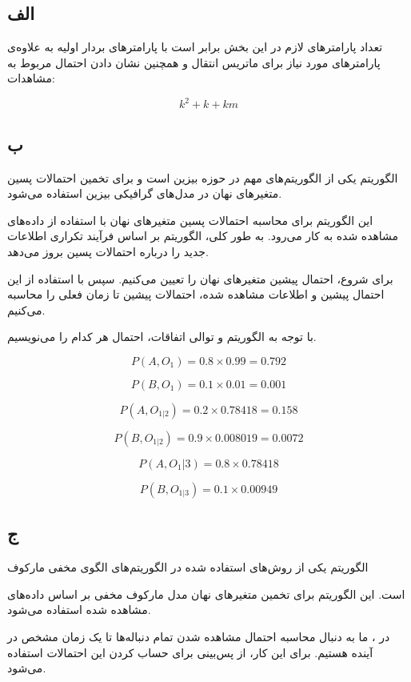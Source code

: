 \subsection*{الف}

تعداد پارامترهای لازم در این بخش برابر است با پارامترهای بردار اولیه به علاوه‌ی پارامترهای مورد نیاز برای ماتریس انتقال و همچنین نشان دادن احتمال مربوط به مشاهدات:

$$
k^2 + k + km	
$$

\subsection*{ب}

الگوریتم
یکی از الگوریتم‌های مهم در حوزه بیزین
است و برای تخمین احتمالات پسین
متغیرهای نهان در مدل‌های گرافیکی بیزین استفاده می‌شود.

این الگوریتم برای محاسبه احتمالات پسین متغیرهای نهان با استفاده از داده‌های مشاهده شده به کار می‌رود. به طور کلی، الگوریتم
بر اساس فرآیند تکراری اطلاعات جدید را درباره احتمالات پسین بروز می‌دهد.

برای شروع، احتمال پیشین
متغیرهای نهان را تعیین می‌کنیم. سپس با استفاده از این احتمال پیشین و اطلاعات مشاهده شده، احتمالات پیشین تا زمان فعلی را محاسبه می‌کنیم.

با توجه به الگوریتم
و توالی اتفاقات، احتمال هر کدام را می‌نویسیم.

$$
P(A, O_1) = 0.8 \times 0.99 = 0.792
$$

$$
P(B, O_1) = 0.1 \times 0.01 = 0.001
$$

$$
P(A, O_{1 | 2}) = 0.2 \times 0.78418 = 0.158
$$

$$
P(B, O_{1 | 2}) = 0.9 \times 0.008019 = 0.0072	
$$

$$
P(A, O_{1} | 3) = 0.8 \times 0.78418
$$

$$
P(B, O_{1 | 3}) = 0.1 \times 0.00949
$$

\subsection*{ج}

الگوریتم
یکی از روش‌های استفاده شده در الگوریتم‌های الگوی مخفی مارکوف


است. این الگوریتم برای تخمین متغیرهای نهان مدل مارکوف مخفی بر اساس داده‌های مشاهده شده استفاده می‌شود.

در
، ما به دنبال محاسبه احتمال مشاهده شدن تمام دنباله‌ها تا یک زمان مشخص در آینده هستیم. برای این کار، از پس‌بینی
برای حساب کردن این احتمالات استفاده می‌شود.


